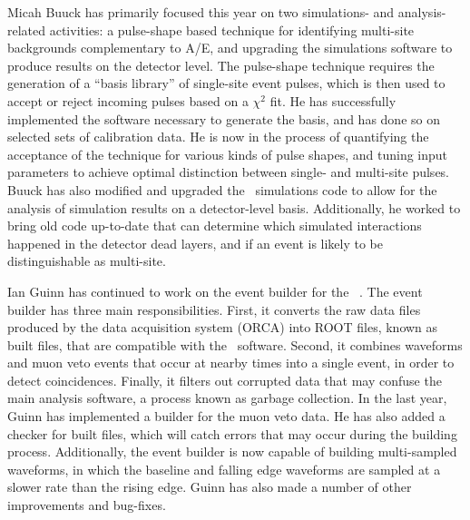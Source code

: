 Micah Buuck has primarily focused this year on two simulations- and analysis-related activities: a pulse-shape based technique for identifying multi-site backgrounds complementary to A/E, and upgrading the simulations software to produce results on the detector level.\newline
\indent The pulse-shape technique requires the generation of a ``basis library'' of single-site event pulses, which is then used to accept or reject incoming pulses based on a $\chi^2$ fit. He has successfully implemented the software necessary to generate the basis, and has done so on selected sets of calibration data. He is now in the process of quantifying the acceptance of the technique for various kinds of pulse shapes, and tuning input parameters to achieve optimal distinction between single- and multi-site pulses.\newline
\indent Buuck has also modified and upgraded the \MJ\ simulations code to allow for the analysis of simulation results on a detector-level basis. Additionally, he worked to bring old code up-to-date that can determine which simulated interactions happened in the detector dead layers, and if an event is likely to be distinguishable as multi-site.

Ian Guinn has continued to work on the event builder for the \MJ\ \MJDemo. The event builder has three main responsibilities. First, it converts the raw data files produced by the data acquisition system (ORCA) into ROOT files, known as built files, that are compatible with the \MJ\ software. Second, it combines waveforms and muon veto events that occur at nearby times into a single event, in order to detect coincidences. Finally, it filters out corrupted data that may confuse the main analysis software, a process known as garbage collection. In the last year, Guinn has implemented a builder for the muon veto data. He has also added a checker for built files, which will catch errors that may occur during the building process. Additionally, the event builder is now capable of building multi-sampled waveforms, in which the baseline and falling edge waveforms are sampled at a slower rate than the rising edge. Guinn has also made a number of other improvements and bug-fixes.


